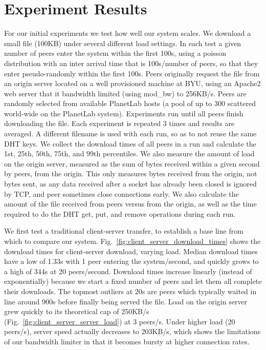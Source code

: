 
\section{Experiment Results}
For our initial experiments we test how well our system scales.  We download a small file (100KB) under several different load settings.  In each test a given number of peers enter the system within the first 100s, using a poisson distribution with an inter arrival time that is 100s/number of peers, so that they enter pseudo-randomly within the first 100s.  Peers originally request the file from an origin server located on a well provisioned machine at BYU, using an Apache2 web server that it bandwidth limited (using mod\_bw) to 256KB/s.  Peers are randomly selected from available PlanetLab hosts (a pool of up to 300 scattered world-wide on the PlanetLab system).  Experiments run until all peers finish downloading the file.  Each experiment is repeated 3 times and results are averaged.  A different filename is used with each run, so as to not reuse the same DHT keys.  We collect the download times of all peers in a run and calculate the 1st, 25th, 50th, 75th, and 99th percentiles.  We also measure the amount of load on the origin server, measured as the sum of bytes received within a given second by peers, from the origin.  This only measures bytes received from the origin, not bytes sent, as any data received after a socket has already been closed is ignored by TCP, and peer sometimes close connections early.  We also calculate the amount of the file received from peers versus from the origin, as well as the time required to do the DHT get, put, and remove operations during each run.

We first test a traditional client-server transfer, to establish a base line from which to compare our system.  Fig.~\ref{fig:client_server_download_times} shows the download times for client-server download, varying load.  Median download times have a low of 1.33s with 1 peer entering the system/second, and quickly grows to a high of 344s at 20 peers/second.  Download times increase linearly (instead of exponentially) because we start a fixed number of peers and let them all complete their downloads.  The topmost outliers at 20s are peers which typically waited in line around 900s before finally being served the file.  Load on the origin server grew quickly to its theoretical cap of 250KB/s (Fig.~\ref{fig:client_server_server_load}) at 3 peers/s.  Under higher load (20 peers/s), server speed actually decreases to 203KB/s, which shows the limitations of our bandwidth limiter in that it becomes bursty at higher connection rates.


